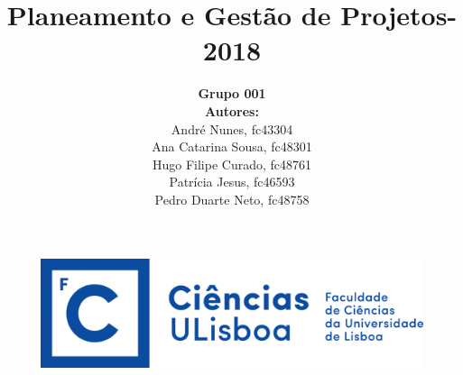 \documentclass[a4paper]{report}
\begin{document}
\title{\textbf{Planeamento e Gestão de Projetos}\linebreak {}-2018\linebreak {}}
\date{}
\author{
	\textbf{Grupo 001}\\
	\textbf{Autores:}\\
	André Nunes, fc43304\\
	Ana Catarina Sousa, fc48301\\ 
	Hugo Filipe Curado, fc48761\\ 
	Patrícia Jesus, fc46593\\
	Pedro Duarte Neto, fc48758
}
\begin{figure}
	\begin{center}
		\includegraphics[scale=.2]{images/LogoFCUL.png}
	\end{center}
\end{figure}
\maketitle
\tableofcontents
\end{document}
